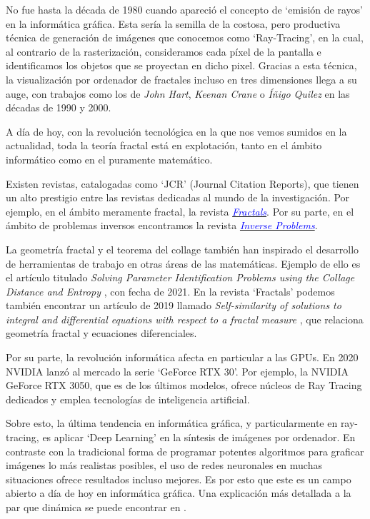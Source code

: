 No fue hasta la década de 1980 cuando apareció el concepto de `emisión de rayos' en la informática gráfica. Esta sería la semilla de la costosa, pero productiva técnica de generación de imágenes que conocemos como `Ray-Tracing', en la cual, al contrario de la rasterización, consideramos cada píxel de la pantalla e identificamos los objetos que se proyectan en dicho pixel. Gracias a esta técnica, la visualización por ordenador de fractales incluso en tres dimensiones llega a su auge, con trabajos como los de \textit{John Hart}, \textit{Keenan Crane} o \textit{Íñigo Quilez} en las décadas de 1990 y 2000.

A día de hoy, con la revolución tecnológica en la que nos vemos sumidos en la actualidad, toda la teoría fractal está en explotación, tanto en el ámbito informático como en el puramente matemático.

Existen revistas, catalogadas como `JCR' (Journal Citation Reports), que tienen un alto prestigio entre las revistas dedicadas al mundo de la investigación. Por ejemplo, en el ámbito meramente fractal, la revista \href{https://www.worldscientific.com/worldscinet/fractals}{\textcolor{blue}{\textit{Fractals}}}. Por su parte, en el ámbito de problemas inversos encontramos la revista \href{https://iopscience.iop.org/journal/0266-5611}{\textcolor{blue}{\textit{Inverse Problems}}}.

La geometría fractal y el teorema del collage también han inspirado el desarrollo de herramientas de trabajo en otras áreas de las matemáticas. Ejemplo de ello es el artículo titulado \textit{Solving Parameter Identification Problems using the Collage Distance and Entropy} \cite{LaTorre}, con fecha de 2021. En la revista `Fractals' podemos también encontrar un artículo de 2019 llamado \textit{Self-similarity of solutions to integral and differential equations with respect to a fractal measure} \cite{LaTorre2019}, que relaciona geometría fractal y ecuaciones diferenciales.

Por su parte, la revolución informática afecta en particular a las GPUs.  En 2020 NVIDIA lanzó al mercado la serie `GeForce RTX 30'. Por ejemplo, la NVIDIA GeForce RTX 3050, que es de los últimos modelos, ofrece núcleos de Ray Tracing dedicados y emplea tecnologías de inteligencia artificial.

Sobre esto, la última tendencia en informática gráfica, y particularmente en ray-tracing, es aplicar `Deep Learning' en la síntesis de imágenes por ordenador. En contraste con la tradicional forma de programar potentes algoritmos para graficar imágenes lo más realistas posibles, el uso de redes neuronales en muchas situaciones ofrece resultados incluso mejores. Es por esto que este es un campo abierto a día de hoy en informática gráfica. Una explicación más detallada a la par que dinámica se puede encontrar en \cite{RT-AI}.

